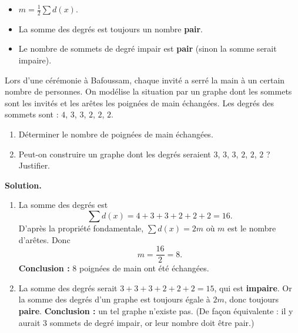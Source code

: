 \documentclass[11pt]{article}
\begin{document}
\begin{aretenir}
\begin{itemize}
\item $\displaystyle m = \frac{1}{2}\sum d(x)$.
\item La somme des degrés est toujours un nombre \textbf{pair}.
\item Le nombre de sommets de degré impair est \textbf{pair} (sinon la somme serait impaire).
\end{itemize}
\end{aretenir}

\begin{exoresolu}
Lors d'une cérémonie à Bafoussam, chaque invité a serré la main à un certain nombre de personnes. On modélise la situation par un graphe dont les sommets sont les invités et les arêtes les poignées de main échangées. Les degrés des sommets sont : $4$, $3$, $3$, $2$, $2$, $2$.
\begin{enumerate}
\item Déterminer le nombre de poignées de main échangées.
\item Peut-on construire un graphe dont les degrés seraient $3$, $3$, $3$, $2$, $2$, $2$ ? Justifier.
\end{enumerate}
\tcblower
\textbf{Solution.}
\begin{enumerate}
\item La somme des degrés est
\[
\sum d(x) = 4+3+3+2+2+2 = 16.
\]
D'après la propriété fondamentale, $\sum d(x) = 2m$ où $m$ est le nombre d'arêtes. Donc
\[
m = \frac{16}{2} = 8.
\]
\textbf{Conclusion :} $8$ poignées de main ont été échangées.
\item La somme des degrés serait $3+3+3+2+2+2 = 15$, qui est \textbf{impaire}. Or la somme des degrés d'un graphe est toujours égale à $2m$, donc toujours \textbf{paire}. \textbf{Conclusion :} un tel graphe n'existe pas. (De façon équivalente : il y aurait $3$ sommets de degré impair, or leur nombre doit être pair.)
\end{enumerate}
\end{exoresolu}
\end{document}
